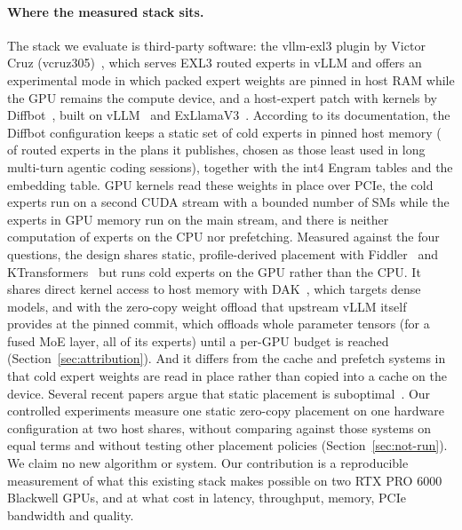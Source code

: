 \paragraph{Where the measured stack sits.}
The stack we evaluate is third-party software: the vllm-exl3 plugin by Victor Cruz (vcruz305)~\citep{vcruz2026vllmexl3},
which serves EXL3 routed experts in vLLM and offers an experimental mode in which packed expert weights are pinned in
host RAM while the GPU remains the compute device, and a host-expert patch with kernels by
Diffbot~\citep{diffbot2026dsv41exl3}, built on vLLM~\citep{kwon2023vllm} and ExLlamaV3~\citep{turboderp2026exllamav3}.
According to its documentation, the Diffbot configuration keeps a static set of cold experts in pinned host memory
( of  routed experts in the plans it publishes, chosen
as those least used in long multi-turn agentic coding sessions), together with the int4 Engram tables and the
embedding table. GPU kernels read these weights in place over PCIe, the cold experts run on a second CUDA stream with a
bounded number of SMs while the experts in GPU memory run on the main stream, and there is neither computation of
experts on the CPU nor prefetching. Measured against the four questions, the design shares static, profile-derived
placement with Fiddler~\citep{kamahori2025fiddler} and KTransformers~\citep{chen2025ktransformers} but runs cold experts
on the GPU rather than the CPU. It shares direct kernel access to host memory with DAK~\citep{lin2026dak}, which
targets dense models, and with the zero-copy weight offload that upstream vLLM itself provides at the pinned commit,
which offloads whole parameter tensors (for a fused MoE layer, all of its experts) until a per-GPU budget is reached
(Section~\ref{sec:attribution}). And it differs from the cache and prefetch systems in that cold expert weights are read
in place rather than copied into a cache on the device. Several recent papers argue that static placement is
suboptimal~\citep{he2026expertflow,zhong2025hybrimoe,zhu2026dali}. Our controlled experiments measure one static
zero-copy placement on one hardware configuration at two host shares, without comparing against those systems on equal
terms and without testing other placement policies (Section~\ref{sec:not-run}). We claim no new algorithm or system.
Our contribution is a reproducible measurement of what this existing stack makes possible on two RTX PRO 6000
Blackwell GPUs, and at what cost in latency, throughput, memory, PCIe bandwidth and quality.
